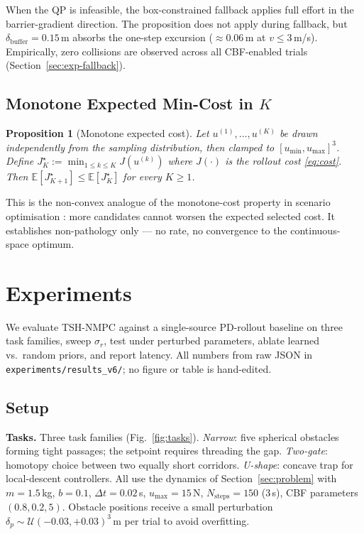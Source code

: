 \documentclass[11pt,onecolumn,a4paper]{article}
\newtheorem{proposition}{Proposition}
\newcommand{\E}{\mathbb{E}}
\newcommand{\dt}{\Delta t}
\begin{document}
When the QP is infeasible, the box-constrained fallback applies full
effort in the barrier-gradient direction. The proposition does not
apply during fallback, but $\delta_{\mathrm{buffer}} = 0.15\,$m
absorbs the one-step excursion (${\approx}0.06\,$m at $v \le 3\,$m/s).
Empirically, zero collisions are observed across all CBF-enabled
trials (Section~\ref{sec:exp-fallback}).

\subsection{Monotone Expected Min-Cost in $K$}

\begin{proposition}[Monotone expected cost]\label{prop:mono}
Let $u^{(1)},\dots,u^{(K)}$ be drawn independently from the sampling
distribution, then clamped to $[u_{\min}, u_{\max}]^3$.
Define $J^\star_K := \min_{1 \le k \le K} J(u^{(k)})$ where
$J(\cdot)$ is the rollout cost \eqref{eq:cost}. Then
$\E[J^\star_{K+1}] \le \E[J^\star_K]$ for every $K \ge 1$.
\end{proposition}

This is the non-convex analogue of the monotone-cost property in
scenario optimisation \cite{CAM08,CAM18}: more candidates cannot
worsen the expected selected cost. It establishes non-pathology
only --- no rate, no convergence to the continuous-space optimum.

\section{Experiments}\label{sec:experiments}

We evaluate TSH-NMPC against a single-source PD-rollout baseline on
three task families, sweep $\sigma_r$, test under perturbed
parameters, ablate learned vs.\ random priors, and report latency.
All numbers from raw JSON in \texttt{experiments/results\_v6/};
no figure or table is hand-edited.

\subsection{Setup}\label{sec:exp-setup}

\textbf{Tasks.} Three task families (Fig.~\ref{fig:tasks}).
\emph{Narrow}: five spherical obstacles forming tight passages;
the setpoint requires threading the gap. \emph{Two-gate}: homotopy
choice between two equally short corridors. \emph{U-shape}: concave
trap for local-descent controllers. All use the dynamics of
Section~\ref{sec:problem} with $m = 1.5\,$kg, $b = 0.1$,
$\dt = 0.02\,$s, $u_{\max} = 15\,$N, $N_{\mathrm{steps}} = 150$
($3\,$s), CBF parameters $(0.8, 0.2, 5)$. Obstacle positions receive
a small perturbation $\delta_p \sim \mathcal{U}(-0.03, +0.03)^3\,$m
per trial to avoid overfitting.
\end{document}

